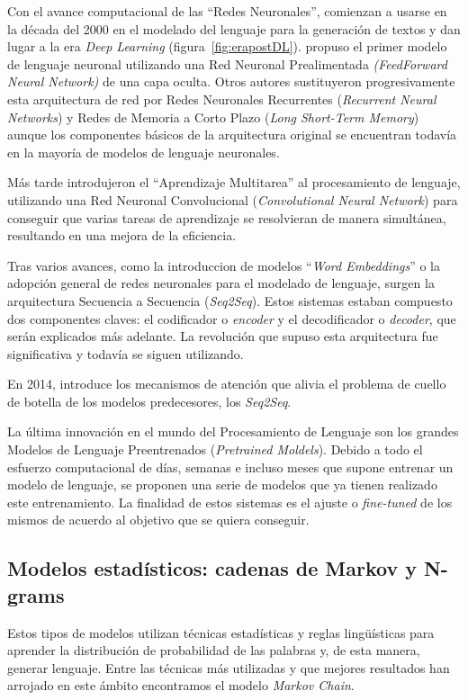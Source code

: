 Con el avance computacional de las ``Redes Neuronales'', comienzan a usarse en la década del 2000 en el modelado del lenguaje para la generación de textos y dan lugar a la era \textit{Deep Learning} (figura~\ref{fig:erapostDL}). \cite{bengio_2000} propuso el primer modelo de lenguaje neuronal utilizando una Red Neuronal Prealimentada  \textit{(FeedForward Neural Network)} de una capa oculta. Otros autores sustituyeron progresivamente esta arquitectura de red por Redes Neuronales Recurrentes (\textit{Recurrent Neural Networks}) y Redes de Memoria a Corto Plazo (\textit{Long Short-Term Memory}) aunque los componentes básicos de la arquitectura original se encuentran todavía en la mayoría de modelos de lenguaje neuronales.

Más tarde \cite{collobertWeston} introdujeron el ``Aprendizaje Multitarea'' al procesamiento de lenguaje, utilizando una Red Neuronal Convolucional (\textit{Convolutional Neural Network}) para conseguir que varias tareas de aprendizaje se resolvieran de manera simultánea, resultando en una mejora de la eficiencia. 

Tras varios avances, como la introduccion de modelos ``\textit{Word Embeddings}'' o la adopción general de redes neuronales para el modelado de lenguaje, surgen la arquitectura Secuencia a Secuencia (\textit{Seq2Seq}). Estos sistemas estaban compuesto dos componentes claves: el codificador o \textit{encoder} y el decodificador o \textit{decoder}, que serán explicados más adelante. La revolución que supuso esta arquitectura fue significativa y todavía se siguen utilizando.

En 2014, \cite{Bahdanau} introduce los mecanismos de atención que alivia el problema de cuello de botella de los modelos predecesores, los \textit{Seq2Seq}.

La última innovación en el mundo del Procesamiento de Lenguaje son los grandes Modelos de Lenguaje Preentrenados (\textit{Pretrained Moldels}). Debido a todo el esfuerzo computacional de días, semanas e incluso meses que supone entrenar un modelo de lenguaje, se proponen una serie de modelos que ya tienen realizado este entrenamiento. La finalidad de estos sistemas es el ajuste o \textit{fine-tuned} de los mismos de acuerdo al objetivo que se quiera conseguir.

\subsection{Modelos estadísticos: cadenas de Markov y N-grams}
Estos tipos de modelos utilizan técnicas estadísticas y reglas lingüísticas para aprender la distribución de probabilidad de las palabras y, de esta manera, generar lenguaje. Entre las técnicas más utilizadas y que mejores resultados han arrojado en este ámbito encontramos el modelo \textit{Markov Chain}.

